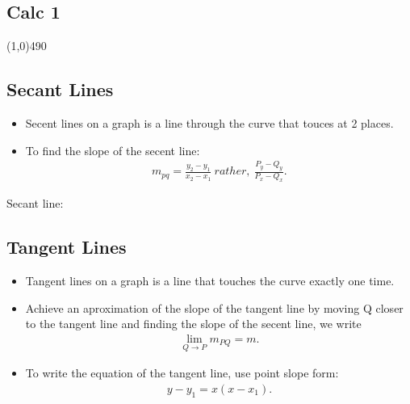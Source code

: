 \documentclass{report}
\begin{document}
  \pagebreak \bigbreak \noindent 
  \begin{minipage}[]{0.47\textwidth}
  \end{minipage}
  \begin{minipage}[]{0.47\textwidth}
  \end{minipage}
  \bigbreak \noindent 
\begin{figure}[ht]
    \centering
    \label{fig:arcthing4}
\end{figure}


    \pagebreak \bigbreak \noindent
    \begin{center}
      \section{\Large{Calc 1}}
    \end{center}
    \line(1,0){490}
    \bigbreak \noindent \bigbreak \noindent 
    \subsection{Secant Lines}
    \begin{itemize}
      \item Secent lines on a graph is a line through the curve that touces at 2 places.
      \item To find the slope of the secent line:
        \begin{align*}
          m_{pq} = \frac{y_{2}-y_{1}}{x_{2}-x_{1}}\ rather,\ \frac{P_{y} - Q_{y}}{P_{x}-Q_{x}}
        .\end{align*}
    \end{itemize}
    \bigbreak \noindent 
    Secant line:
    \begin{figure}[ht]
        \centering
        \label{fig:secline}
    \end{figure}

    \bigbreak \noindent \bigbreak \noindent
    \subsection{Tangent Lines}
    \begin{itemize}
      \item Tangent lines on a graph is a line that touches the curve exactly one time.
      \item Achieve an aproximation of the slope of the tangent line by moving Q closer to the tangent line and finding the slope of the secent line, we write
        \begin{align*}
          \lim\limits_{Q \to P}{m_{PQ} = m}
        .\end{align*}
      \item To write the equation of the tangent line, use point slope form:
        \begin{align*}
          y- y_{1} = x(x-x_{1})
        .\end{align*}
    \end{itemize}
\end{document}
